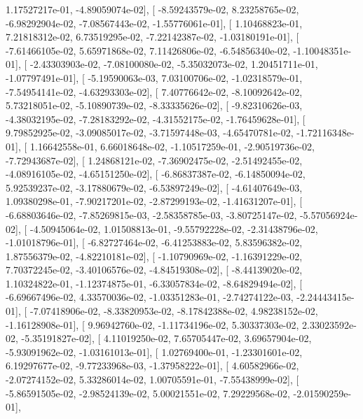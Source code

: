 \documentclass{article}
\begin{document}
          1.17527217e-01,  -4.89059074e-02],
       [ -8.59243579e-02,   8.23258765e-02,  -6.98292904e-02,
         -7.08567443e-02,  -1.55776061e-01],
       [  1.10468823e-01,   7.21818312e-02,   6.73519295e-02,
         -7.22142387e-02,  -1.03180191e-01],
       [ -7.61466105e-02,   5.65971868e-02,   7.11426806e-02,
         -6.54856340e-02,  -1.10048351e-01],
       [ -2.43303903e-02,  -7.08100080e-02,  -5.35032073e-02,
          1.20451711e-01,  -1.07797491e-01],
       [ -5.19590063e-03,   7.03100706e-02,  -1.02318579e-01,
         -7.54954141e-02,  -4.63293303e-02],
       [  7.40776642e-02,  -8.10092642e-02,   5.73218051e-02,
         -5.10890739e-02,  -8.33335626e-02],
       [ -9.82310626e-03,  -4.38032195e-02,  -7.28183292e-02,
         -4.31552175e-02,  -1.76459628e-01],
       [  9.79852925e-02,  -3.09085017e-02,  -3.71597448e-03,
         -4.65470781e-02,  -1.72116348e-01],
       [  1.16642558e-01,   6.66018648e-02,  -1.10517259e-01,
         -2.90519736e-02,  -7.72943687e-02],
       [  1.24868121e-02,  -7.36902475e-02,  -2.51492455e-02,
         -4.08916105e-02,  -4.65151250e-02],
       [ -6.86837387e-02,  -6.14850094e-02,   5.92539237e-02,
         -3.17880679e-02,  -6.53897249e-02],
       [ -4.61407649e-03,   1.09380298e-01,  -7.90217201e-02,
         -2.87299193e-02,  -1.41631207e-01],
       [ -6.68803646e-02,  -7.85269815e-03,  -2.58358785e-03,
         -3.80725147e-02,  -5.57056924e-02],
       [ -4.50945064e-02,   1.01508813e-01,  -9.55792228e-02,
         -2.31438796e-02,  -1.01018796e-01],
       [ -6.82727464e-02,  -6.41253883e-02,   5.83596382e-02,
          1.87556379e-02,  -4.82210181e-02],
       [ -1.10790969e-02,  -1.16391229e-02,   7.70372245e-02,
         -3.40106576e-02,  -4.84519308e-02],
       [ -8.44139020e-02,   1.10324822e-01,  -1.12374875e-01,
         -6.33057834e-02,  -8.64829494e-02],
       [ -6.69667496e-02,   4.33570036e-02,  -1.03351283e-01,
         -2.74274122e-03,  -2.24443415e-01],
       [ -7.07418906e-02,  -8.33820953e-02,  -8.17842388e-02,
          4.98238152e-02,  -1.16128908e-01],
       [  9.96942760e-02,  -1.11734196e-02,   5.30337303e-02,
          2.33023592e-02,  -5.35191827e-02],
       [  4.11019250e-02,   7.65705447e-02,   3.69657904e-02,
         -5.93091962e-02,  -1.03161013e-01],
       [  1.02769400e-01,  -1.23301601e-02,   6.19297677e-02,
         -9.77233968e-03,  -1.37958222e-01],
       [  4.60582966e-02,  -2.07274152e-02,   5.33286014e-02,
          1.00705591e-01,  -7.55438999e-02],
       [ -5.86591505e-02,  -2.98524139e-02,   5.00021551e-02,
          7.29229568e-02,  -2.01590259e-01],
\end{document}
